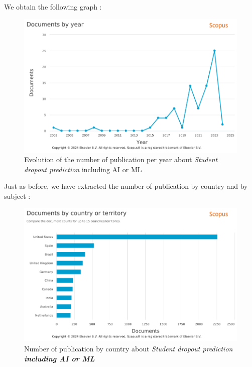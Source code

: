 \documentclass[../../main.tex]{subfiles}
\begin{document}
We obtain the following graph :
\begin{figure}
    \centering
    \includegraphics[width=1\linewidth]{res//graph/prediction student with AI/PredictingStudentDropoutW_AI_ML.png}
    \caption{Evolution of the number of publication per year about \textit{Student dropout prediction} including AI or ML}
    \label{fig:nb_pub_scopus_predictstudent_AI}
\end{figure}

Just as before, we have extracted the number of publication by country and by subject :
\begin{figure}
    \centering
    \includegraphics[width=1\linewidth]{res//graph/prediction student with AI/Scopus-Analyze-Country.png}
    \caption{Number of publication by country about \textit{Student dropout prediction \textbf{including AI or ML}}}
    \label{fig:nb_pub_scopus_predictstudent_country}
\end{figure}
\end{document}
